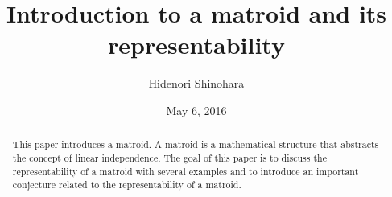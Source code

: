 \documentclass[psamsfonts]{amsart}
\title{Introduction to a matroid and its representability}
\author{Hidenori Shinohara}
\date{May 6, 2016}
\theoremstyle{definition}
\theoremstyle{remark}
\numberwithin{equation}{section}
\begin{document}
\begin{abstract}
This paper introduces a matroid. 
A matroid is a mathematical structure that abstracts the concept of linear independence.
The goal of this paper is to discuss the representability of a matroid with several examples and to introduce an important conjecture related to the representability of a matroid.
\end{abstract}

\maketitle











\end{document}
